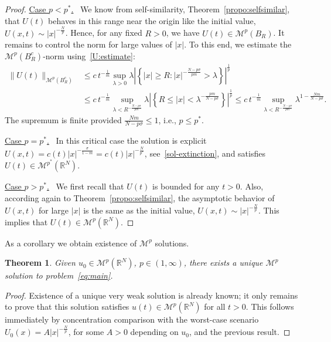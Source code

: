 \documentclass[leqno,12pt]{amsart}
\newtheorem{theorem}{Theorem}[section]
\theoremstyle{definition}
\theoremstyle{remark}
\numberwithin{equation}{section}
\begin{document}
\begin{proof}     
\noindent\underline{Case $p< p^*$.} \ 
We know from self-similarity, Theorem~\ref{propo:selfsimilar}, that \( U(t) \) behaves in this range near the origin like the initial value, $U(x,t)\sim|x|^{-\frac{N}{p}}$. Hence, for any fixed \(R>0\), we have \(U(t)\in \mathcal{M}^p(B_R)\). It remains to control the norm for large values of $|x|$. To this end, we estimate the \( \mathcal{M}^p(B_R^c) \)-norm using~\eqref{U:estimate}:
\begin{align*}
    \|U(t)\|_{\mathcal{M}^p(B^c_R)} 
    &\le c\,t^{-\frac{1}{m}}\sup_{\lambda>0} \lambda \left|\left\{|x|\ge R : |x|^{-\frac{N-p\sigma}{pm}} > \lambda \right\}\right|^{\frac{1}{p}} \\
    & \le c\,t^{-\frac{1}{m}}\sup_{\lambda<R^{-\frac{N-p\sigma}{pm}}} \lambda \left|\left\{R\le |x|<\lambda^{-\frac{pm}{N-p\sigma}} \right\}\right|^{\frac{1}{p}}\le c\,t^{-\frac{1}{m}}\sup_{\lambda<R^{-\frac{N-p\sigma}{pm}}}\lambda^{1-\frac{Nm}{N-p\sigma}}.
\end{align*}
The supremum is finite provided $\frac{Nm}{N-p\sigma}\le 1$, i.e., $p\le p^*$.

\noindent\underline{Case $p=p^*$.} \ In this critical case the solution is explicit $U(x,t)=c(t)|x|^{-\frac\sigma{1-m}}=c(t)|x|^{-\frac N{p^*}}$, see~\eqref{sol-extinction}, and satisfies $U(t) \in \mathcal{M}^{p^*}(\mathbb{R}^N)$.

\noindent\underline{Case $p>p^*$.} \
We first recall that $U(t)$ is bounded for any $t>0$. Also, according again to Theorem~\ref{propo:selfsimilar}, the asymptotic behavior of $U(x,t)$ for large $|x|$ is the same as the initial value,
$U(x,t) \sim |x|^{-\frac{N}{p}}$.
This implies that $U(t) \in \mathcal{M}^p(\mathbb{R}^N)$. 
\end{proof}

As a corollary we obtain existence of $\mathcal{M}^p$ solutions.
\begin{theorem}\label{solution in Mp}
    Given $u_0\in \mathcal{M}^p(\mathbb{R}^N)$, $p\in(1,\infty)$, there exists a unique $\mathcal{M}^p$ solution to problem~\eqref{eq:main}. 
\end{theorem}

\begin{proof}
     Existence of a unique very weak solution is already known; it only remains to prove that this  solution satisfies $u(t)\in \mathcal{M}^p(\mathbb{R}^N)$ for all $t>0$. This follows immediately by concentration comparison with the worst-case scenario $U_0(x) = A |x|^{-\frac{N}{p}}$, for some $A>0$ depending on $u_0$, and the previous result.
\end{proof}
\end{document}
